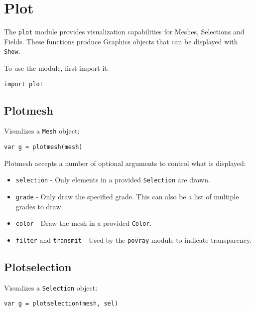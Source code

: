 \hypertarget{plot}{%
\section{Plot}\label{plot}}

The \texttt{plot} module provides visualization capabilities for Meshes,
Selections and Fields. These functions produce Graphics objects that can
be displayed with \texttt{Show}.

To use the module, first import it:

\begin{lstlisting}
import plot
\end{lstlisting}

\hypertarget{plotmesh}{%
\subsection{Plotmesh}\label{plotmesh}}

Visualizes a \texttt{Mesh} object:

\begin{lstlisting}
var g = plotmesh(mesh)
\end{lstlisting}

Plotmesh accepts a number of optional arguments to control what is
displayed:

\begin{itemize}

\item
  \texttt{selection} - Only elements in a provided \texttt{Selection}
  are drawn.
\item
  \texttt{grade} - Only draw the specified grade. This can also be a
  list of multiple grades to draw.
\item
  \texttt{color} - Draw the mesh in a provided \texttt{Color}.
\item
  \texttt{filter} and \texttt{transmit} - Used by the \texttt{povray}
  module to indicate transparency.
\end{itemize}

\hypertarget{plotselection}{%
\subsection{Plotselection}\label{plotselection}}

Visualizes a \texttt{Selection} object:

\begin{lstlisting}
var g = plotselection(mesh, sel)
\end{lstlisting}

